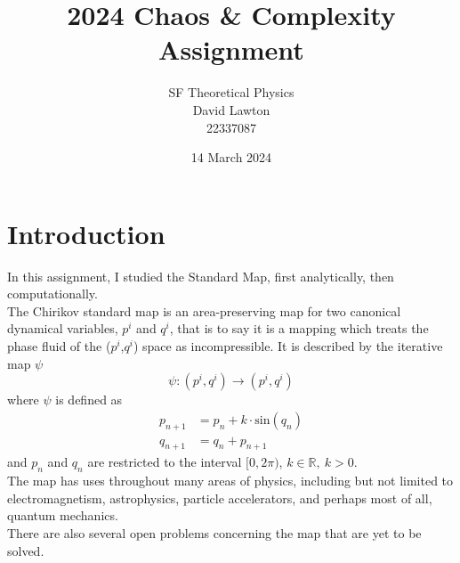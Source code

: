 \documentclass{article}
\title{2024 Chaos \& Complexity Assignment}
\author{SF Theoretical Physics \\David Lawton\\22337087}
\date{14 March 2024}
\begin{document}
\maketitle
\vfill
\tableofcontents

\newpage
\newcommand{\R}{\mathbb{R}}
\section{Introduction}
In this assignment, I studied the Standard Map, first analytically, then computationally.\\
\indent The Chirikov standard map is an area-preserving map for two canonical dynamical variables, $p^i$ and $q^i$, that is to say it is a mapping which treats the phase fluid of the ($p^i$,$q^i$) space as incompressible. It is described by the iterative map $\psi$
\begin{equation}
\psi : (p^i,q^i)\rightarrow(p^i,q^i)
\end{equation}
where $\psi$ is defined as
\begin{equation} \label{eq: StandardMap}
\begin{split}
 p_{n+1} & = p_n + k\cdot\mathrm{sin}(q_n)\\
q_{n+1} & = q_n + p_{n+1}
\end{split}
\end{equation}
and $p_n$ and $q_n$ are restricted to the interval $[0,2 \pi )$, $ k \in \R , ~ k > 0$.\\
\indent The map has uses throughout many areas of physics, including but not limited to electromagnetism, astrophysics, particle accelerators,	and perhaps most of all, quantum mechanics.\\
\indent There are also several open problems concerning the map that are yet to be solved.
\end{document}
